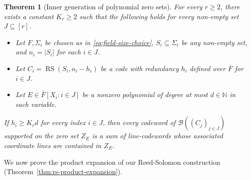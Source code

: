 \documentclass[11pt,letterpaper]{article}
\renewcommand{\ge}{\geqslant}
\newtheorem{theorem}{Theorem}[section]
\theoremstyle{definition}
\theoremstyle{remark}
\newcommand{\RS}{\operatorname{RS}}
\begin{document}
\begin{theorem}[Inner generation of polynomial zero sets]
\label{thm:inner-generation-main}
For every $r \ge 2$, there exists a constant $K_r \ge 2$
such that the following holds for every non-empty set $J \subseteq [r]$.
\begin{itemize}[itemsep=0pt]
    \item Let $F, \Sigma_i$ be chosen as in \eqref{eq:field-size-choice}, $S_i \subseteq \Sigma_i$ be any non-empty set, and $n_i = |S_i|$ for each $i \in J$.
    \item Let $C_i = \RS(S_i,n_i-h_i)$ be a code with redundancy $h_i$ defined over $\overline{F}$ for $i \in J$.
    \item Let $E \in \overline{F}[X_i : i\in J]$ be a nonzero polynomial of degree at most $d \in \mathbb N$ in each variable.
\end{itemize}
If $h_i \ge K_r d$ for every index $i\in J$, then every codeword of
$\mathcal{B}((C_j)_{j\in J})$ supported on the zero set $Z_E$
is a sum of line-codewords whose associated
coordinate lines are contained in $Z_E$.
\end{theorem}

We now prove the product expansion of our Reed-Solomon construction (Theorem~\ref{thm:rs-product-expansion}).
\end{document}
